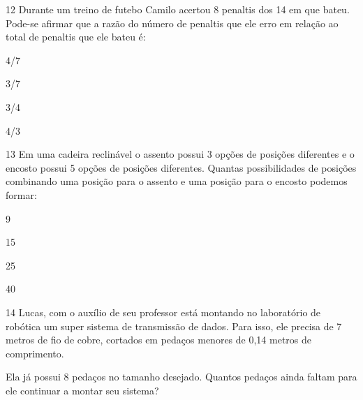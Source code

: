 
\num{12} Durante um treino de futebo Camilo acertou 8 penaltis dos 14 em
que bateu. Pode-se afirmar que a razão do número de penaltis que ele
erro em relação ao total de penaltis que ele bateu é:

\begin{escolha}
\item
  4/7
\item
  3/7
\item
  3/4
\item
  4/3
\end{escolha}


\num{13} Em uma cadeira reclinável o assento possui 3 opções de posições
diferentes e o encosto possui 5 opções de posições diferentes. Quantas
possibilidades de posições combinando uma posição para o assento e uma
posição para o encosto podemos formar:

\begin{escolha}
\item
  9
\item
  15
\item
  25
\item
  40
\end{escolha}


\num{14} Lucas, com o auxílio de seu professor está montando no laboratório
de robótica um super sistema de transmissão de dados. Para isso, ele
precisa de 7 metros de fio de cobre, cortados em pedaços menores de 0,14
metros de comprimento.

Ela já possui 8 pedaços no tamanho desejado. Quantos pedaços ainda
faltam para ele continuar a montar seu sistema?

